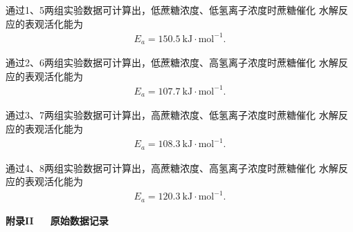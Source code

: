\documentclass[12pt]{ctexart}
\numberwithin{equation}{section}
\begin{document}
通过1、5两组实验数据可计算出，低蔗糖浓度、低氢离子浓度时蔗糖催化
水解反应的表观活化能为
\begin{align}
    E_a = 150.5~\mathrm{kJ\cdot mol^{-1}}.
    \tag{I.9}
\end{align}

通过2、6两组实验数据可计算出，低蔗糖浓度、高氢离子浓度时蔗糖催化
水解反应的表观活化能为
\begin{align}
    E_a = 107.7~\mathrm{kJ\cdot mol^{-1}}.
    \tag{I.11}
\end{align}

通过3、7两组实验数据可计算出，高蔗糖浓度、低氢离子浓度时蔗糖催化
水解反应的表观活化能为
\begin{align}
    E_a = 108.3~\mathrm{kJ\cdot mol^{-1}}.
    \tag{I.12}
\end{align}


通过4、8两组实验数据可计算出，高蔗糖浓度、高氢离子浓度时蔗糖催化
水解反应的表观活化能为
\begin{align}
    E_a = 120.3~\mathrm{kJ\cdot mol^{-1}}.
    \tag{I.10}
\end{align}

\newpage

\begin{center}
    \Large\bfseries{附录II~~~原始数据记录}
\end{center}
\end{document}
